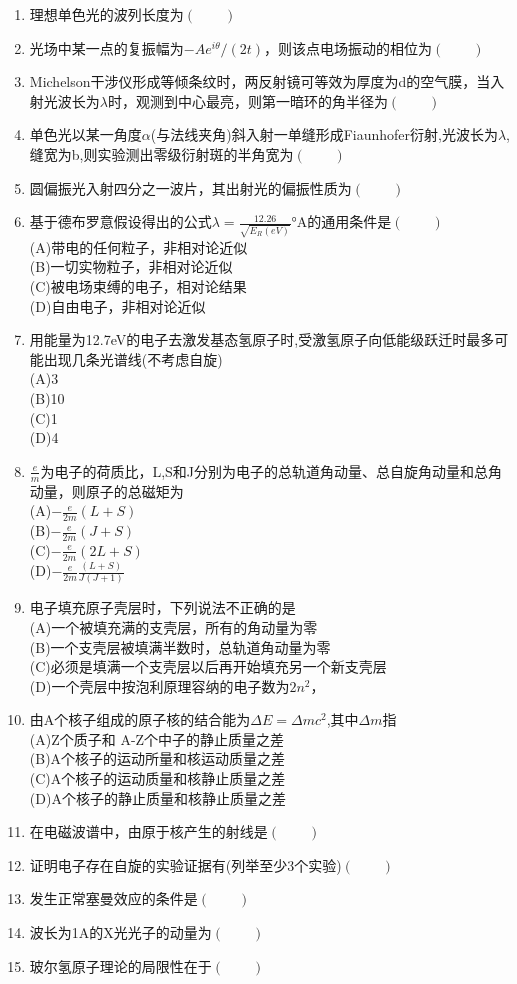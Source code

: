 \begin{enumerate}
(D)右旋椭圆偏振光
\item 理想单色光的波列长度为$(\qquad)$
\item 光场中某一点的复振幅为$-Ae^{i\theta}/ (2t)$，则该点电场振动的相位为$(\qquad)$
\item Michelson干涉仪形成等倾条纹时，两反射镜可等效为厚度为d的空气膜，当入射光波长为$\lambda$时，观测到中心最亮，则第一暗环的角半径为$(\qquad)$
\item 单色光以某一角度$\alpha$(与法线夹角)斜入射一单缝形成Fiaunhofer衍射,光波长为$\lambda$,缝宽为b,则实验测出零级衍射斑的半角宽为$(\qquad)$
\item 圆偏振光入射四分之一波片，其出射光的偏振性质为$(\qquad)$
\item 基于德布罗意假设得出的公式$\lambda=\frac{12.26}{\sqrt{E_R(eV)}}$°A的通用条件是$(\qquad)$\\
(A)带电的任何粒子，非相对论近似\\
(B)一切实物粒子，非相对论近似\\
(C)被电场束缚的电子，相对论结果\\
(D)自由电子，非相对论近似
\item 用能量为12.7eV的电子去激发基态氢原子时,受激氢原子向低能级跃迁时最多可能出现几条光谱线(不考虑自旋)\\
(A)3\\
(B)10\\
(C)1\\
(D)4
\item $\frac{e}{m}$为电子的荷质比，L,S和J分别为电子的总轨道角动量、总自旋角动量和总角动量，则原子的总磁矩为\\
(A)$\displaystyle -\frac{e}{2m}(L+S)$\\
(B)$\displaystyle -\frac{e}{2m}(J+S)$\\
(C)$\displaystyle -\frac{e}{2m}(2L+S)$\\
(D)$\displaystyle -\frac{e}{2m}\frac{(L+S)}{J(J+1)}$
\item 电子填充原子壳层时，下列说法不正确的是\\
(A)一个被填充满的支壳层，所有的角动量为零\\
(B)一个支壳层被填满半数时，总轨道角动量为零\\
(C)必须是填满一个支壳层以后再开始填充另一个新支壳层\\
(D)一个壳层中按泡利原理容纳的电子数为$2n^2$，
\item 由A个核子组成的原子核的结合能为$\Delta E=\Delta mc^2$,其中$\Delta m$指\\
(A)Z个质子和 A-Z个中子的静止质量之差\\
(B)A个核子的运动所量和核运动质量之差\\
(C)A个核子的运动质量和核静止质量之差\\
(D)A个核子的静止质量和核静止质量之差
\item 在电磁波谱中，由原于核产生的射线是$(\qquad)$
\item 证明电子存在自旋的实验证据有(列举至少3个实验)$(\qquad)$
\item 发生正常塞曼效应的条件是$(\qquad)$
\item 波长为1A的X光光子的动量为$(\qquad)$
\item 玻尔氢原子理论的局限性在于$(\qquad)$
\end{enumerate}
